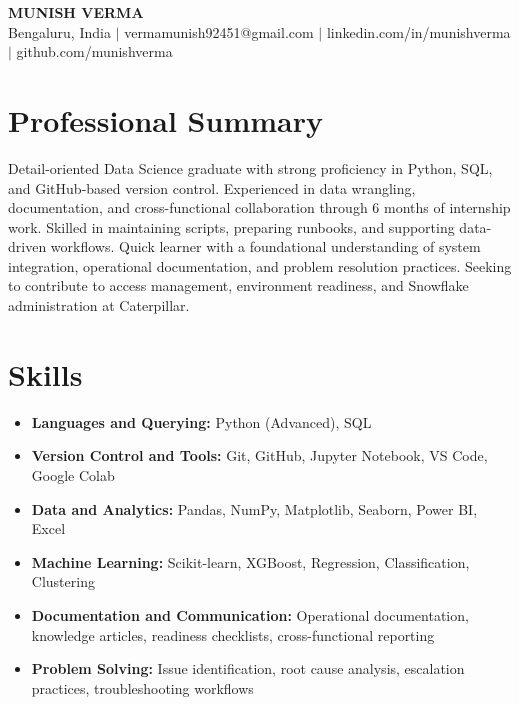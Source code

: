 \documentclass{article}
\begin{document}
\begin{center}
{\LARGE \textbf{MUNISH VERMA}} \\[4pt]
Bengaluru, India $|$ vermamunish92451@gmail.com $|$ linkedin.com/in/munishverma $|$ github.com/munishverma
\end{center}

\vspace{4pt}

\section*{Professional Summary}
Detail-oriented Data Science graduate with strong proficiency in Python, SQL, and GitHub-based version control. Experienced in data wrangling, documentation, and cross-functional collaboration through 6 months of internship work. Skilled in maintaining scripts, preparing runbooks, and supporting data-driven workflows. Quick learner with a foundational understanding of system integration, operational documentation, and problem resolution practices. Seeking to contribute to access management, environment readiness, and Snowflake administration at Caterpillar.

\vspace{4pt}

\section*{Skills}
\begin{itemize}
    \item \textbf{Languages and Querying:} Python (Advanced), SQL
    \item \textbf{Version Control and Tools:} Git, GitHub, Jupyter Notebook, VS Code, Google Colab
    \item \textbf{Data and Analytics:} Pandas, NumPy, Matplotlib, Seaborn, Power BI, Excel
    \item \textbf{Machine Learning:} Scikit-learn, XGBoost, Regression, Classification, Clustering
    \item \textbf{Documentation and Communication:} Operational documentation, knowledge articles, readiness checklists, cross-functional reporting
    \item \textbf{Problem Solving:} Issue identification, root cause analysis, escalation practices, troubleshooting workflows
\end{itemize}

\vspace{4pt}
\end{document}
